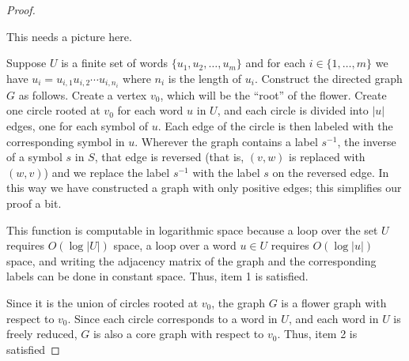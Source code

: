 \documentclass{article}
\begin{document}
\begin{proof}
  \begin{todo}This needs a picture here.\end{todo}
  Suppose $U$ is a finite set of words $\{u_1, u_2, \dotsc, u_m\}$ and for each $i \in \{1, \dotsc, m\}$ we have $u_i = u_{i, 1}u_{i, 2}\dotsb u_{i, n_i}$ where $n_i$ is the length of $u_i$.
  Construct the directed graph $G$ as follows.
  Create a vertex $v_0$, which will be the ``root'' of the flower.
  Create one circle rooted at $v_0$ for each word $u$ in $U$, and each circle is divided into $|u|$ edges, one for each symbol of $u$.
  Each edge of the circle is then labeled with the corresponding symbol in $u$.
  Wherever the graph contains a label $s^{-1}$, the inverse of a symbol $s$ in $S$, that edge is reversed (that is, $(v, w)$ is replaced with $(w, v)$) and we replace the label $s^{-1}$ with the label $s$ on the reversed edge.
  In this way we have constructed a graph with only positive edges; this simplifies our proof a bit.

  This function is computable in logarithmic space because a loop over the set $U$ requires $O(\log |U|)$ space, a loop over a word $u \in U$ requires $O(\log |u|)$ space, and writing the adjacency matrix of the graph and the corresponding labels can be done in constant space.
  Thus, item 1 is satisfied.

  Since it is the union of circles rooted at $v_0$, the graph $G$ is a flower graph with respect to $v_0$.
  Since each circle corresponds to a word in $U$, and each word in $U$ is freely reduced, $G$ is also a core graph with respect to $v_0$.
  Thus, item 2 is satisfied


\end{proof}
\end{document}

